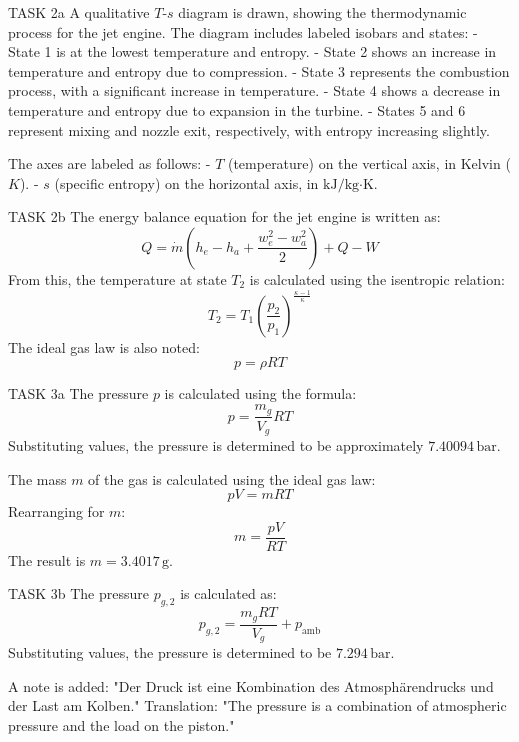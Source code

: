 TASK 2a  
A qualitative \( T \)-\( s \) diagram is drawn, showing the thermodynamic process for the jet engine. The diagram includes labeled isobars and states:  
- State 1 is at the lowest temperature and entropy.  
- State 2 shows an increase in temperature and entropy due to compression.  
- State 3 represents the combustion process, with a significant increase in temperature.  
- State 4 shows a decrease in temperature and entropy due to expansion in the turbine.  
- States 5 and 6 represent mixing and nozzle exit, respectively, with entropy increasing slightly.  

The axes are labeled as follows:  
- \( T \) (temperature) on the vertical axis, in Kelvin (\( K \)).  
- \( s \) (specific entropy) on the horizontal axis, in \( \text{kJ}/\text{kg·K} \).  

TASK 2b  
The energy balance equation for the jet engine is written as:  
\[
Q = \dot{m} \left( h_e - h_a + \frac{w_e^2 - w_a^2}{2} \right) + Q - W
\]  
From this, the temperature at state \( T_2 \) is calculated using the isentropic relation:  
\[
T_2 = T_1 \left( \frac{p_2}{p_1} \right)^{\frac{\kappa - 1}{\kappa}}
\]  
The ideal gas law is also noted:  
\[
p = \rho R T
\]  

TASK 3a  
The pressure \( p \) is calculated using the formula:  
\[
p = \frac{m_g}{V_g} R T
\]  
Substituting values, the pressure is determined to be approximately \( 7.40094 \, \text{bar} \).  

The mass \( m \) of the gas is calculated using the ideal gas law:  
\[
p V = m R T
\]  
Rearranging for \( m \):  
\[
m = \frac{p V}{R T}
\]  
The result is \( m = 3.4017 \, \text{g} \).  

TASK 3b  
The pressure \( p_{g,2} \) is calculated as:  
\[
p_{g,2} = \frac{m_g R T}{V_g} + p_{\text{amb}}
\]  
Substituting values, the pressure is determined to be \( 7.294 \, \text{bar} \).  

A note is added:  
"Der Druck ist eine Kombination des Atmosphärendrucks und der Last am Kolben."  
Translation: "The pressure is a combination of atmospheric pressure and the load on the piston."